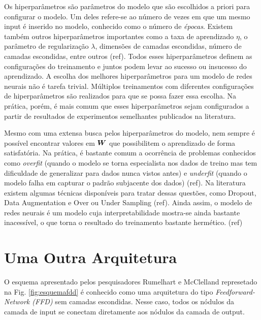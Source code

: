 Os hiperparâmetros são parâmetros do modelo que são escolhidos a priori para configurar o modelo. Um deles refere-se ao número de vezes em que um mesmo input é inserido no modelo, conhecido como o número de \textit{épocas}. Existem também outros hiperparâmetros importantes como a taxa de aprendizado $\eta$, o parâmetro de regularização $\lambda$, dimensões de camadas escondidas, número de camadas escondidas, entre outros (ref). Todos esses hiperparâmetros definem as configurações do treinamento e juntos podem levar ao sucesso ou insucesso do aprendizado. A escolha dos melhores hiperparâmetros para um modelo de redes neurais não é tarefa trivial. Múltiplos treinamentos com diferentes configurações de hiperparâmetros são realizados para que se possa fazer essa escolha. Na prática, porém, é mais comum que esses hiperparâmetros sejam configurados a partir de resultados de experimentos semelhantes publicados na literatura.   

Mesmo com uma extensa busca pelos hiperparâmetros do modelo, nem sempre é possível encontrar valores em $\bm{W}$ que possibilitem o aprendizado de forma satisfatória. Na prática, é bastante comum a ocorrência de problemas conhecidos como \textit{overfit} (quando o modelo se torna especialista nos dados de treino mas tem dificuldade de generalizar para dados nunca vistos antes) e \textit{underfit} (quando o modelo falha em capturar o padrão subjacente dos dados) (ref). Na literatura existem algumas técnicas disponíveis para tratar dessas questões, como Dropout, Data Augmentation e Over ou Under Sampling (ref). Ainda assim, o modelo de redes neurais é um modelo cuja interpretabilidade mostra-se ainda bastante inacessível, o que torna o resultado do treinamento bastante hermético. (ref)   %

\section{Uma Outra Arquitetura}
\label{sec:arqFDD}
O esquema apresentado pelos pesquisadores Rumelhart e McClelland represetado na Fig. \ref{fig:esquemafdd} é conhecido como uma arquitetura do tipo \textit{Feedforward-Network (FFD)} sem camadas escondidas. Nesse caso, todos os nódulos da camada de input se conectam diretamente aos nódulos da camada de output.


